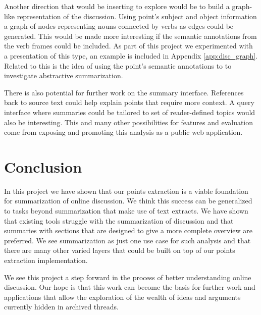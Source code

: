     Another direction that would be inserting to explore would be to build a graph-like representation of the discussion. Using point's subject and object information a graph of nodes representing nouns connected by verbs as edges could be generated. This would be made more interesting if the semantic annotations from the verb frames could be included. As part of this project we experimented with a presentation of this type, an example is included in Appendix \ref{app:disc_graph}. Related to this is the idea of using the point's semantic annotations to to investigate abstractive summarization.

    There is also potential for further work on the summary interface. References back to source text could help explain points that require more context. A query interface where summaries could be tailored to set of reader-defined topics would also be interesting. This and many other possibilities for features and evaluation come from exposing and promoting this analysis as a public web application.

  \section{Conclusion}
    In this project we have shown that our points extraction is a viable foundation for summarization of online discussion. We think this success can be generalized to tasks beyond summarization that make use of text extracts. We have shown that existing tools struggle with the summarization of discussion and that summaries with sections that are designed to give a more complete overview are preferred. We see summarization as just one use case for such analysis and that there are many other varied layers that could be built on top of our points extraction implementation.

    We see this project a step forward in the process of better understanding online discussion. Our hope is that this work can become the basis for further work and applications that allow the exploration of the wealth of ideas and arguments currently hidden in archived threads.
